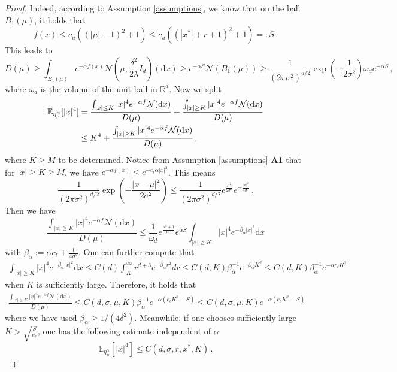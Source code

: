 \documentclass[reqno]{amsart}
\numberwithin{algorithm}{section}
\newcommand{\diff}{\mathrm{d}}
\newcommand{\R}{\mathbb{R}}
\newcommand{\EE}{{\mathbb E}}
\newcommand{\mc}[1]{\mathcal{#1}}
\begin{document}
{\begin{proof}
Indeed, according to Assumption \ref{assumptions}, we know that on the ball $B_1(\mu)$, it holds that
    \begin{equation}
        f(x)\leq c_u((|\mu|+1)^2+1)\leq c_u ((|x^*|+r+1)^2+1)=:S\,.
    \end{equation}
This leads to
\begin{equation*}
    D(\mu)\geq \int_{B_1(\mu)}e^{-\alpha f(x)}\mc{N}\left(\mu,\frac{\delta^2}{2\lambda}I_d\right)(\diff x)\geq e^{-\alpha S} \mc{N}(B_1(\mu))\geq \frac{1}{(2\pi\sigma^2)^{d/2}}\exp\left(-\frac{1}{2\sigma^2}\right)\omega_d e^{-\alpha S}\,,
\end{equation*}
where $\omega_d$ is the volume of the unit ball in $\R^d$. Now we split
\begin{align}
    \EE_{\eta_\mu^\alpha}[|x|^4]&=\frac{\int_{|x|\leq K}|x|^4e^{-\alpha f}\mc{N}(\diff x)}{D(\mu)}+\frac{\int_{|x|\geq K}|x|^4e^{-\alpha f}\mc{N}(\diff x)}{D(\mu)}\notag\\
    &\leq K^4+\frac{\int_{|x|\geq K}|x|^4e^{-\alpha f}\mc{N}(\diff x)}{D(\mu)}\,,
\end{align}
where $K\geq M$ to be determined. Notice from Assumption \ref{assumptions}-\textbf{A1} that for $|x|\geq K\geq M$, we have $e^{-\alpha f(x)}\leq e^{-c_\ell \alpha|x|^2}$. This means 
\begin{equation}
    \frac{1}{(2\pi\sigma^2)^{d/2}}\exp\left(-\frac{|x-\mu|^2}{2\sigma^2}\right)\leq  \frac{1}{(2\pi\sigma^2)^{d/2}} e^{\frac{\mu^2}{2\sigma^2}}e^{-\frac{|x|^2}{4\sigma^2}}\,.
\end{equation}
Then we have
\begin{equation}
  \frac{\int_{|x|\geq K}|x|^4e^{-\alpha f}\mc{N}(\diff x)}{D(\mu)}\leq \frac{1}{\omega_d}e^{\frac{\mu^2+1}{2\sigma^2}}e^{\alpha S}\int_{|x|\geq K}|x|^4 e^{-\beta_\alpha|x|^2}\diff x
\end{equation}
with $\beta_\alpha:=\alpha c_\ell+\frac{1}{4\sigma^2}$. One can further compute that
\begin{align}
    \int_{|x|\geq K}|x|^4 e^{-\beta_\alpha|x|^2}\diff x \leq C(d)\int_K^\infty r^{d+3}e^{-\beta_\alpha r^2}dr\leq C(d,K)\beta_\alpha^{-1}e^{-\beta_\alpha K^2}\leq C(d,K)\beta_\alpha^{-1}e^{-\alpha c_\ell K^2}
\end{align}
when $K$ is sufficiently large. Therefore, it holds that
\begin{align}
  \frac{\int_{|x|\geq K}|x|^4e^{-\alpha f}\mc{N}(\diff x)}{D(\mu)}
  \leq C(d,\sigma,\mu,K)\beta_\alpha^{-1}e^{-\alpha (c_\ell K^2-S)}\leq C(d,\sigma,\mu,K)e^{-\alpha (c_\ell K^2-S)}
\end{align}
where we have used $\beta_\alpha\geq 1/(4\delta^2)$. Meanwhile, if one chooses sufficiently large $K>\sqrt{\frac{S}{c_\ell}}$, one has the following estimate independent of $\alpha$
\begin{equation}\label{moment}
     \EE_{\eta_\mu^\alpha}[|x|^4]\leq C(d,\sigma,r,x^*,K)\,.
\end{equation}



\end{proof}}
\end{document}

